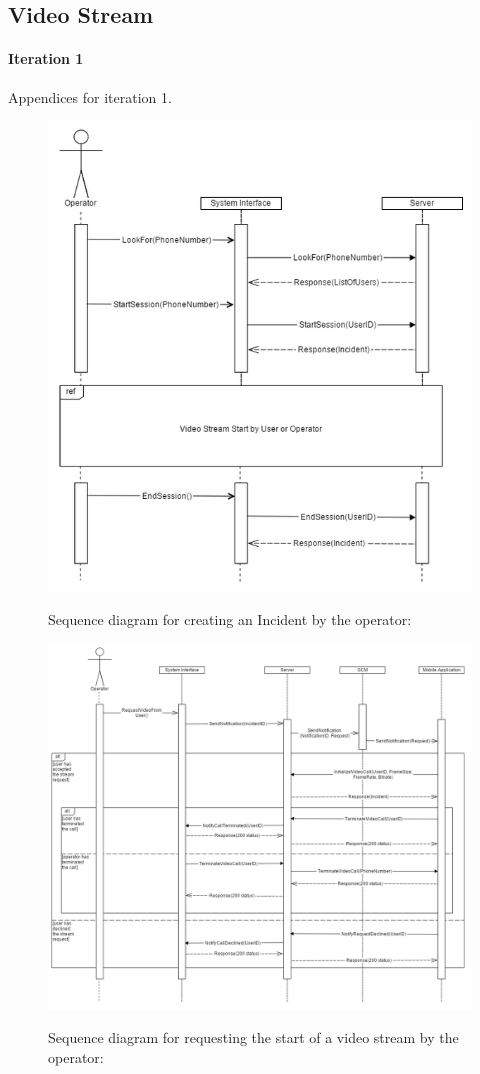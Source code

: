 \documentclass{article}
\begin{document}
    \subsection{Video Stream}
    \paragraph{Iteration 1} Appendices for iteration 1.
    
	\begin{figure}[H]
		\centering
		\includegraphics[width=.9\textwidth]{"VideoStream/1"}

		Sequence diagram for creating an Incident by the operator:
	\end{figure} \clearpage
	
	
	\begin{figure}[h]
		\centering
		\includegraphics[width=.9\textwidth]{"VideoStream/2"}

		Sequence diagram for requesting the start of a video stream by the operator:
	\end{figure} \clearpage
	
\end{document}
